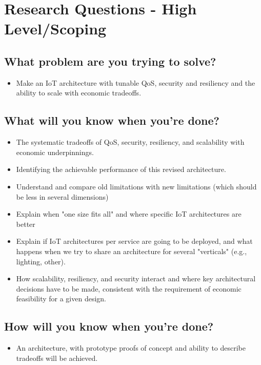 \documentclass[../main.tex]{subfiles}
\begin{document}
\chapter{Research Questions - High Level/Scoping}

\section{What problem are you trying to solve?}

\begin{itemize}
    \item Make an IoT architecture with tunable QoS, security and resiliency and the ability to scale with economic tradeoffs.
\end{itemize}

\section{What will you know when you're done?}

\begin{itemize}
    \item The systematic tradeoffs of QoS, security, resiliency, and scalability with economic underpinnings.
    \item Identifying the achievable performance of this revised architecture.
    \item Understand and compare old limitations with new limitations (which should be less in several dimensions)
    \item Explain when "one size fits all" and where specific IoT architectures are better
    \item Explain if IoT architectures per service are going to be deployed, and what happens when we try to share an architecture for several "verticals" (e.g., lighting, other).
    \item How scalability, resiliency, and security interact and where key architectural decisions have to be made, consistent with the requirement of economic feasibility for a given design.
\end{itemize}


\section{How will you know when you're done?}

\begin{itemize}
    \item An architecture, with prototype proofs of concept and ability to describe tradeoffs will be achieved.
\end{itemize}
\end{document}
